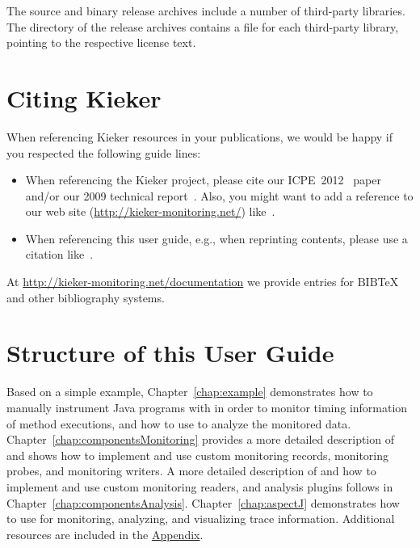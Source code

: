 The \Kieker{} source and binary release archives include a number of third-party %
libraries. %
The  directory of the release archives contains a %
 file for each third-party library, pointing to the respective license text.

\section{Citing Kieker}\label{sec:ch1:citingKieker}

When referencing Kieker resources in your publications, we would be happy if you %
respected the following guide lines:

\begin{itemize}
\item When referencing the Kieker project, please cite our %
ICPE~2012~\cite{KiekerICPE2012} paper and/or our 2009 technical report~\cite{vanHoornRohrHasselbringWallerEhlersFreyKieselhorst2009TRContinuousMonitoringOfSoftwareServicesDesignAndApplicationOfTheKiekerFramework}. %
Also, you might want to add a reference to our web site (\url{http://kieker-monitoring.net/}) %
like~\cite{KiekerWebSite}. 
\item When referencing this user guide, e.g., when reprinting contents, please %
use a citation like~\cite{Kieker1.6UserGuide}.
\end{itemize}

\noindent At \url{http://kieker-monitoring.net/documentation} we provide %
entries for $\mathrm{B\scriptstyle IB}\!$\TeX{} and other bibliography %
systems.

\section{Structure of this User Guide}

Based on a simple example, Chapter~\ref{chap:example} demonstrates %
how to manually instrument Java programs with \KiekerMonitoringPart{} %
in order to monitor timing information of method executions, and %
how to use \KiekerAnalysisPart{} to analyze the monitored data. %
Chapter~\ref{chap:componentsMonitoring} provides a more detailed %
description of \KiekerMonitoringPart{} and shows how to implement and %
use custom monitoring records, monitoring probes, and monitoring writers. %
A more detailed description of \KiekerAnalysisPart{} and how to implement and use %
custom monitoring readers, and analysis plugins follows in %
Chapter~\ref{chap:componentsAnalysis}. %
Chapter~\ref{chap:aspectJ} demonstrates how to use \KiekerTraceAnalysis{} %
for monitoring, analyzing, and visualizing trace information. %
Additional resources are included in the \hyperlink{hypertarget:appendix}{Appendix}.

